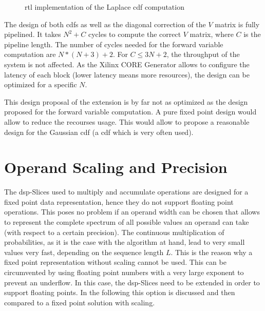 \documentclass[mscthesis]{usiinfthesis}
\begin{document}
\begin{figure}
    \centering
    
    \caption{\acrshort{rtl} implementation of the Laplace \acrshort{cdf}
        computation}
    \label{fig:arch_cdf2}
\end{figure}

The design of both \glspl{cdf} as well as the diagonal correction of the $V$
matrix is fully pipelined. It takes $N^2+C$ cycles to compute the correct $V$
matrix, where $C$ is the pipeline length. The number of cycles needed for the
forward variable computation are $N*(N+3)+2$. For $C \leq 3N+2$, the throughput
of the system is not affected. As the Xilinx CORE Generator allows to configure
the latency of each block (lower latency means more resources), the design can
be optimized for a specific $N$.

This design proposal of the extension is by far not as optimized as the design
proposed for the forward variable computation. A pure fixed point design
would allow to reduce the recourses usage. This would allow to propose
a reasonable design for the Gaussian \gls{cdf} (a \gls{cdf} which is very
often used).

\section{Operand Scaling and Precision}
\label{ch:design_scaling}

The \gls{dsp}-Slices used to multiply and accumulate operations are designed for
a fixed point data representation, hence they do not support floating point
operations. This poses no problem if an operand width can be chosen that allows
to represent the complete spectrum of all possible values an operand can take
(with respect to a certain precision). The continuous multiplication of
probabilities, as it is the case with the algorithm at hand, lead to very small
values very fast, depending on the sequence length $L$. This is the reason why
a fixed point representation without scaling cannot be used. This can be
circumvented by using floating point numbers with a very large exponent to
prevent an underflow. In this case, the \gls{dsp}-Slices need to be extended in order
to support floating points. In the following this option is discussed and then
compared to a fixed point solution with scaling.
\end{document}
